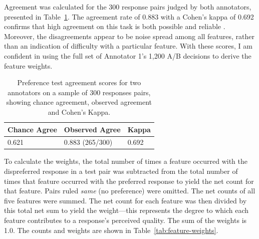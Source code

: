 Agreement was calculated for the 300 response pairs judged by both annotators, presented in Table~\ref{tab:preference-agreement}. The agreement rate of 0.883 with a Cohen's kappa of 0.692 confirms that high agreement on this task is both possible and reliable \citep{landis1977measurement, artstein:massimo:2008}. Moreover, the disagreements appear to be noise spread among all features, rather than an indication of difficulty with a particular feature. With these scores, I am confident in using the full set of Annotator 1's 1,200 A/B decisions to derive the feature weights.

\begin{table}[htb!]
\begin{center}
\begin{tabular}{|l|l|l|}
\hline
 Chance Agree & Observed Agree & Kappa \\
\hline
0.621 & 0.883 (265/300) & 0.692 \\
\hline
\end{tabular}
\caption{\label{tab:preference-agreement} Preference test agreement scores for two annotators on a sample of 300 responses pairs, showing chance agreement, observed agreement and Cohen's Kappa.}
\end{center}
\end{table}

To calculate the weights, the total number of times a feature occurred with the dispreferred response in a test pair was subtracted from the total number of times that feature occurred with the preferred response to yield the net count for that feature. Pairs ruled \textit{same} (no preference) were omitted. The net counts of all five features were summed. The net count for each feature was then divided by this total net sum to yield the weight---this represents the degree to which each feature contributes to a response's perceived quality. The sum of the weights is 1.0. The counts and weights are shown in Table~\ref{tab:feature-weights}.

